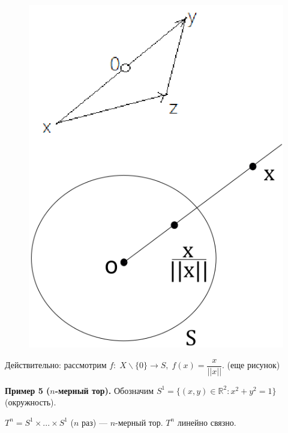 \documentclass[12pt,a4paper]{article}
\begin{document}
\begin{figure}
	\includegraphics[width=0.8\linewidth]{lect8_78.png}
\end{figure}

Действительно: рассмотрим $f: \; X \backslash \{0\} \to S, \; f(x) = \dfrac{x}{||x||}.$ (еще рисунок)

\textbf{Пример 5 ($n$-мерный тор).} Обозначим $S^{1} = \{(x, y) \in \mathbb{R}^{2}: x^{2} + y^{2} = 1\}$ (окружность).

$T^{n} = S^{1} \times ... \times S^{1}$ ($n$ раз) --- $n$-мерный тор. $T^{n}$ линейно связно.
\end{document}
